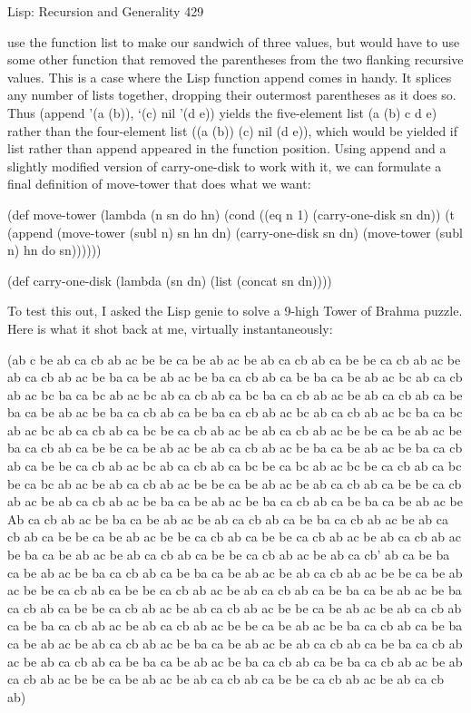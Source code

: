 Lisp: Recursion and Generality                                                        429

use the function list to make our sandwich of three values, but would have to use
some other function that removed the parentheses from the two flanking recursive
values.
        This is a case where the Lisp function append comes in handy. It splices any
number of lists together, dropping their outermost parentheses as it does so. Thus
(append '(a (b)), ‘(c) nil '(d e)) yields the five-element list (a (b) c d e) rather than
the four-element list ((a (b)) (c) nil (d e)), which would be yielded if list rather than
append appeared in the function position. Using append and a slightly modified
version of carry-one-disk to work with it, we can formulate a final definition of
move-tower that does what we want:

(def move-tower (lambda (n sn do hn)
      (cond ((eq n 1) (carry-one-disk sn dn))
             (t (append (move-tower (subl n) sn hn dn)
                    (carry-one-disk sn dn)
                    (move-tower (subl n) hn do sn))))))

(def carry-one-disk (lambda (sn dn) (list (concat sn dn))))

To test this out, I asked the Lisp genie to solve a 9-high Tower of Brahma puzzle.
Here is what it shot back at me, virtually instantaneously:

 (ab c be ab ca cb ab ac be be ca be ab ac be ab ca cb ab ca be be ca cb ab ac be
ab ca cb ab ac be ba ca be ab ac be ba ca cb ab ca be ba ca be ab ac bc ab ca cb
ab ac bc ba ca bc ab ac bc ab ca cb ab ca bc ba ca cb ab ac be ab ca cb ab ca be
ba ca be ab ac be ba ca cb ab ca be ba ca cb ab ac bc ab ca cb ab ac bc ba ca bc
ab ac bc ab ca cb ab ca bc be ca cb ab ac be ab ca cb ab ac be be ca be ab ac be
ba ca cb ab ca be be ca be ab ac be ab ca cb ab ac be ba ca be ab ac be ba ca cb
ab ca be be ca cb ab ac bc ab ca cb ab ca bc be ca bc ab ac bc be ca cb ab ca bc be
ca bc ab ac be ab ca cb ab ac be be ca be ab ac be ab ca cb ab ca be be ca cb ab ac
be ab ca cb ab ac be ba ca be ab ac be ba ca cb ab ca be ba ca be ab ac be Ab ca
cb ab ac be ba ca be ab ac be ab ca cb ab ca be ba ca cb ab ac be ab ca cb ab ca
be be ca be ab ac be be ca cb ab ca be be ca cb ab ac be ab ca cb ab ac be ba ca be
ab ac be ab ca cb ab ca be be ca cb ab ac be ab ca cb' ab ca be ba ca be ab ac be
ba ca cb ab ca be ba ca be ab ac be ab ca cb ab ac be be ca be ab ac be be ca cb
ab ca be be ca cb ab ac be ab ca cb ab ca be ba ca be ab ac be ba ca cb ab ca be
be ca cb ab ac be ab ca cb ab ac be be ca be ab ac be ab ca cb ab ca be ba ca cb
ab ac be ab ca cb ab ac be be ca be ab ac be ba ca cb ab ca be ba ca be ab ac be
ab ca cb ab ac be ba ca be ab ac be ab ca cb ab ca be ba ca cb ab ac be ab ca cb
ab ca be ba ca be ab ac be ba ca cb ab ca be ba ca cb ab ac be ab ca cb ab ac be
be ca be ab ac be ab ca cb ab ca be be ca cb ab ac be ab ca cb ab)

